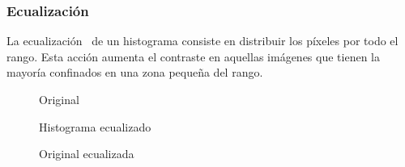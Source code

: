 \subsubsection{Ecualización}
La ecualización~\emph{\citep*[3.1.4 Histogram
  equalization]{szeliski2010computer}} de un histograma consiste en
distribuir los píxeles por todo el rango. Esta acción aumenta el
contraste en aquellas imágenes que tienen la mayoría confinados en una
zona pequeña del rango.

\begin{figure}[H]
  \caption{Original}
  \centering \setlength\fboxsep{0pt} \setlength\fboxrule{0.5pt}
\end{figure}

\begin{figure}[H]
  \caption{Histograma ecualizado}
  \centering \setlength\fboxsep{0pt} \setlength\fboxrule{0.5pt}
\end{figure}

\begin{figure}[H]
  \caption{Original ecualizada}
  \centering \setlength\fboxsep{0pt} \setlength\fboxrule{0.5pt}
\end{figure}

